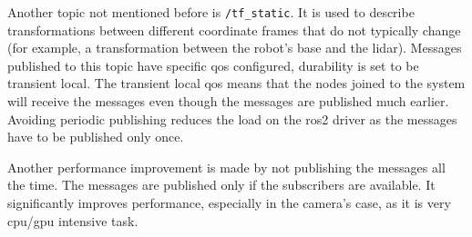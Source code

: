 Another topic not mentioned before is \texttt{/tf\_static}. 
It is used to describe transformations between different coordinate frames that do not typically change (for example, a transformation between the robot's base and the \ac{lidar}).
Messages published to this topic have specific \ac{qos} configured, durability is set to be transient local.
The transient local \ac{qos} means that the nodes joined to the system will receive the messages even though the messages are published much earlier.
Avoiding periodic publishing reduces the load on the \ac{ros2} driver as the messages have to be published only once.

Another performance improvement is made by not publishing the messages all the time.
The messages are published only if the subscribers are available.
It significantly improves performance, especially in the camera's case, as it is very \acs{cpu}/\acs{gpu} intensive task.

